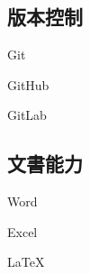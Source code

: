 \documentclass[]{deedy-resume-openfont-ch}
\begin{document}
\begin{minipage}[t]{0.5\textwidth}
\vspace{\topsep}
\begin{minipage}[t]{0.45\textwidth}
    \subsection{版本控制}
    \vspace{\topsep}
    \vspace{\topsep}
    \begin{tightemize}
        \item Git
        \item GitHub
        \item GitLab
    \end{tightemize}
\end{minipage}
\hfill
\begin{minipage}[t]{0.45\textwidth}
    \subsection{文書能力}
    \vspace{\topsep}
    \vspace{\topsep}
    \begin{tightemize}
        \item Word
        \item Excel
        \item LaTeX\
    \end{tightemize}
\end{minipage}

\end{minipage}
\end{document}
